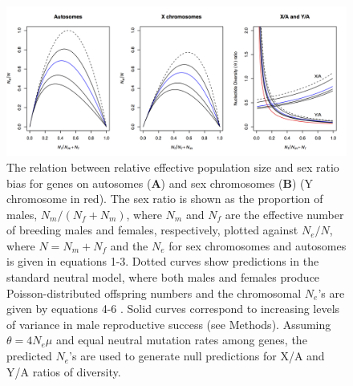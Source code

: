 \documentclass[9pt,twocolumn,twoside]{gsajnl}
\begin{document}







\begin{figure}[htbp]
\centering
\noindent
\includegraphics[width=\linewidth]{figure1.jpg}
\caption{The relation between relative effective population size and sex ratio bias for genes on autosomes (\textbf{A}) and sex chromosomes (\textbf{B}) (Y chromosome in red). The sex ratio is shown as the proportion of males, $N_{m}/(N_{f}+N_{m})$, where $N_{m}$ and $N_{f}$ are the effective number of breeding males and females, respectively, plotted against $N_{e}/N$, where $N=N_{m}+N_{f}$ and the $N_{e}$ for sex chromosomes and autosomes is given in equations 1-3. Dotted curves show predictions in the standard neutral model, where both males and females produce Poisson-distributed offspring numbers and the chromosomal $N_{e}$'s are given by equations 4-6 \citep{wright1931evolution}. Solid curves correspond to increasing levels of variance in male reproductive success \citep{nomura2002effective} (see Methods). Assuming $\theta=4N_{e}\mu$ and equal neutral mutation rates among genes, the predicted $N_{e}$'s are used to generate null predictions for X/A and Y/A ratios of diversity.
}
\label{fig:spectrum}
\end{figure}
\end{document}
